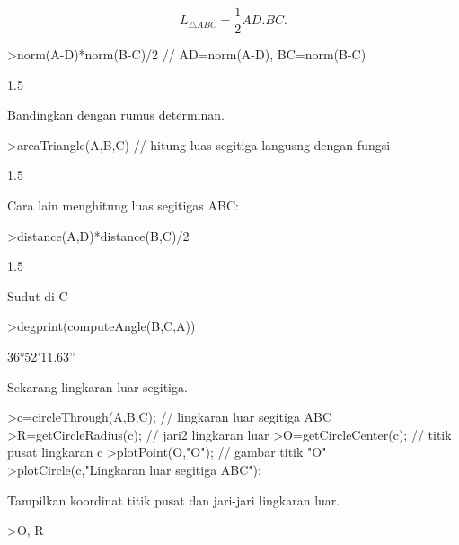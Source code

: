 \documentclass[a4paper,10pt]{article}
\begin{document}
\begin{eulernotebook}
\begin{eulercomment}
\begin{eulercomment}
\begin{eulercomment}
\end{eulercomment}
\begin{eulerformula}
\[
L_{\triangle ABC}= \frac{1}{2}AD.BC.
\]
\end{eulerformula}
\begin{eulerprompt}
>norm(A-D)*norm(B-C)/2 // AD=norm(A-D), BC=norm(B-C)
\end{eulerprompt}
\begin{euleroutput}
  1.5
\end{euleroutput}
\begin{eulercomment}
Bandingkan dengan rumus determinan.
\end{eulercomment}
\begin{eulerprompt}
>areaTriangle(A,B,C) // hitung luas segitiga langusng dengan fungsi
\end{eulerprompt}
\begin{euleroutput}
  1.5
\end{euleroutput}
\begin{eulercomment}
Cara lain menghitung luas segitigas ABC:
\end{eulercomment}
\begin{eulerprompt}
>distance(A,D)*distance(B,C)/2
\end{eulerprompt}
\begin{euleroutput}
  1.5
\end{euleroutput}
\begin{eulercomment}
Sudut di C
\end{eulercomment}
\begin{eulerprompt}
>degprint(computeAngle(B,C,A))
\end{eulerprompt}
\begin{euleroutput}
  36°52'11.63''
\end{euleroutput}
\begin{eulercomment}
Sekarang lingkaran luar segitiga.
\end{eulercomment}
\begin{eulerprompt}
>c=circleThrough(A,B,C); // lingkaran luar segitiga ABC
>R=getCircleRadius(c); // jari2 lingkaran luar 
>O=getCircleCenter(c); // titik pusat lingkaran c 
>plotPoint(O,"O"); // gambar titik "O"
>plotCircle(c,"Lingkaran luar segitiga ABC"):
\end{eulerprompt}
\begin{eulercomment}
Tampilkan koordinat titik pusat dan jari-jari lingkaran luar.
\end{eulercomment}
\begin{eulerprompt}
>O, R
\end{eulerprompt}

\end{eulercomment}
\end{eulercomment}
\end{eulernotebook}
\end{document}
